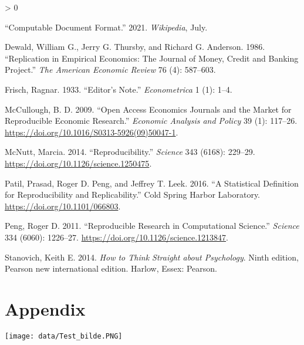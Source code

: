 \documentclass[
  12pt,
  twoside]{article}
\newlength{\cslhangindent}
\newenvironment{CSLReferences}[2] %
 {%
  \setlength{\parindent}{0pt}
  \ifodd #1 \everypar{\setlength{\hangindent}{\cslhangindent}}\ignorespaces\fi
  \ifnum #2 > 0
  \setlength{\parskip}{#2\baselineskip}
  \fi
 }%
 {}
\begin{document}
\hypertarget{refs}{}
\begin{CSLReferences}{1}{0}
\leavevmode\hypertarget{ref-ComputableDocumentFormat2021}{}%
{``Computable {Document Format}.''} 2021. \emph{Wikipedia}, July.

\leavevmode\hypertarget{ref-dewaldReplicationEmpiricalEconomics1986}{}%
Dewald, William G., Jerry G. Thursby, and Richard G. Anderson. 1986.
{``Replication in {Empirical Economics}: {The Journal} of {Money},
{Credit} and {Banking Project}.''} \emph{The American Economic Review}
76 (4): 587--603.

\leavevmode\hypertarget{ref-frischEditorNote1933}{}%
Frisch, Ragnar. 1933. {``Editor's {Note}.''} \emph{Econometrica} 1 (1):
1--4.

\leavevmode\hypertarget{ref-mcculloughOpenAccessEconomics2009}{}%
McCullough, B. D. 2009. {``Open {Access Economics Journals} and the
{Market} for {Reproducible Economic Research}.''} \emph{Economic
Analysis and Policy} 39 (1): 117--26.
\url{https://doi.org/10.1016/S0313-5926(09)50047-1}.

\leavevmode\hypertarget{ref-mcnuttReproducibility2014}{}%
McNutt, Marcia. 2014. {``Reproducibility.''} \emph{Science} 343 (6168):
229--29. \url{https://doi.org/10.1126/science.1250475}.

\leavevmode\hypertarget{ref-patilStatisticalDefinitionReproducibility2016}{}%
Patil, Prasad, Roger D. Peng, and Jeffrey T. Leek. 2016. {``A
Statistical Definition for Reproducibility and Replicability.''} {Cold
Spring Harbor Laboratory}. \url{https://doi.org/10.1101/066803}.

\leavevmode\hypertarget{ref-pengReproducibleResearchComputational2011}{}%
Peng, Roger D. 2011. {``Reproducible {Research} in {Computational
Science}.''} \emph{Science} 334 (6060): 1226--27.
\url{https://doi.org/10.1126/science.1213847}.

\leavevmode\hypertarget{ref-stanovichHowThinkStraight2014}{}%
Stanovich, Keith E. 2014. \emph{How to Think Straight about Psychology}.
Ninth edition, Pearson new international edition. {Harlow, Essex}:
{Pearson{}}.

\end{CSLReferences}

\hypertarget{appendix}{%
\section{Appendix}\label{appendix}}

\texttt{[image: data/Test\_bilde.PNG]}
\end{document}
